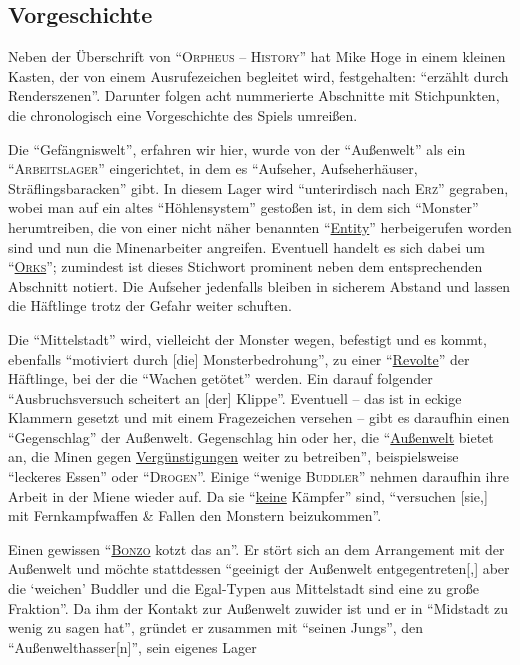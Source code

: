 \documentclass[a5paper,pagesize,numbers=noenddot]{scrbook}
\begin{document}
\subsection{Vorgeschichte}\label{sec:orpheus_geschichte_vorgeschichte}
Neben der Überschrift von \enquote{\textsc{Orpheus -- History}} hat Mike Hoge in einem kleinen Kasten, der von einem Ausrufezeichen begleitet wird, festgehalten:
\enquote{erzählt durch Renderszenen}.
Darunter folgen acht nummerierte Abschnitte mit Stichpunkten, die chronologisch eine Vorgeschichte des Spiels umreißen.

Die \enquote{Gefängniswelt}, erfahren wir hier, wurde von der \enquote{Außenwelt} als ein \enquote{\textsc{Arbeitslager}} eingerichtet, in dem es \enquote{Aufseher, Aufseherhäuser, Sträflingsbaracken} gibt.
In diesem Lager wird \enquote{unterirdisch nach \textsc{Erz}} gegraben, wobei man auf ein altes \enquote{Höhlensystem} gestoßen ist, in dem sich \enquote{Monster} herumtreiben, die von einer nicht näher benannten \enquote{\uline{Entity}} herbeigerufen worden sind und nun die Minenarbeiter angreifen.
Eventuell handelt es sich dabei um \enquote{\textsc{\uline{Orks}}}; zumindest ist dieses Stichwort prominent neben dem entsprechenden Abschnitt notiert.
Die Aufseher jedenfalls bleiben in sicherem Abstand und lassen die Häftlinge trotz der Gefahr weiter schuften.

Die \enquote{Mittelstadt} wird, vielleicht der Monster wegen, befestigt und es kommt, ebenfalls \enquote{motiviert durch [die] Monsterbedrohung}, zu einer \enquote{\uline{Revolte}} der Häftlinge, bei der die \enquote{Wachen getötet} werden.
Ein darauf folgender \enquote{Ausbruchsversuch scheitert an [der] Klippe}.
Eventuell -- das ist in eckige Klammern gesetzt und mit einem Fragezeichen versehen -- gibt es daraufhin einen \enquote{Gegenschlag} der Außenwelt.
Gegenschlag hin oder her, die \enquote{\uline{Außenwelt} bietet an, die Minen gegen \uline{Vergünstigungen} weiter zu betreiben}, beispielsweise \enquote{leckeres Essen} oder \enquote{\textsc{Drogen}}.
Einige \enquote{wenige \textsc{Buddler}} nehmen daraufhin ihre Arbeit in der Miene wieder auf. Da sie \enquote{\uline{keine} Kämpfer} sind, \enquote{versuchen [sie,] mit Fernkampfwaffen \& Fallen den Monstern beizukommen}.

Einen gewissen \enquote{\textsc{\uline{Bonzo}} kotzt das an}.
Er stört sich an dem Arrangement mit der Außenwelt und möchte stattdessen \enquote{geeinigt der Außenwelt entgegentreten[,] aber die \enquote{weichen} Buddler und die Egal-Typen aus Mittelstadt sind eine zu große Fraktion}.
Da ihm der Kontakt zur Außenwelt zuwider ist und er in \enquote{Midstadt zu wenig zu sagen hat}, gründet er zusammen mit \enquote{seinen Jungs}, den \enquote{Außenwelthasser[n]}, sein eigenes Lager
\end{document}
